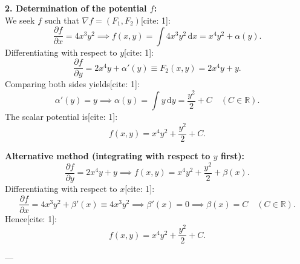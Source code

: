 \medskip
\textbf{2. Determination of the potential $f$:}\\
We seek $f$ such that $\nabla f = (F_1, F_2)$[cite: 1]:
\[
\frac{\partial f}{\partial x} = 4x^3 y^2 \implies f(x, y) = \int 4x^3 y^2 \,\mathrm{d}x = x^4 y^2 + \alpha(y).
\]
Differentiating with respect to $y$[cite: 1]:
\[
\frac{\partial f}{\partial y} = 2x^4 y + \alpha'(y) \equiv F_2(x, y) = 2x^4 y + y.
\]
Comparing both sides yields[cite: 1]:
\[
\alpha'(y) = y \implies \alpha(y) = \int y\,\mathrm{d}y = \frac{y^2}{2} + C \quad (C \in \mathbb{R}).
\]
The scalar potential is[cite: 1]:
\[
f(x, y) = x^4 y^2 + \frac{y^2}{2} + C.
\]

\textbf{Alternative method (integrating with respect to $y$ first):}
\[
\frac{\partial f}{\partial y} = 2x^4 y + y \implies f(x, y) = x^4 y^2 + \frac{y^2}{2} + \beta(x).
\]
Differentiating with respect to $x$[cite: 1]:
\[
\frac{\partial f}{\partial x} = 4x^3 y^2 + \beta'(x) \equiv 4x^3 y^2 \implies \beta'(x) = 0 \implies \beta(x) = C \quad (C \in \mathbb{R}).
\]
Hence[cite: 1]:
\[
f(x, y) = x^4 y^2 + \frac{y^2}{2} + C.
\]

---

